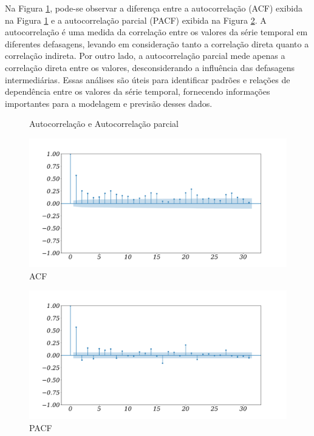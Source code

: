 Na Figura \ref{fig:acfa}, pode-se observar a diferença entre a autocorrelação (ACF) exibida na Figura \ref{fig:acfa} e a autocorrelação parcial (PACF) exibida na Figura \ref{fig:pacf}. A autocorrelação é uma medida da correlação entre os valores da série temporal em diferentes defasagens, levando em consideração tanto a correlação direta quanto a correlação indireta. Por outro lado, a autocorrelação parcial mede apenas a correlação direta entre os valores, desconsiderando a influência das defasagens intermediárias. Essas análises são úteis para identificar padrões e relações de dependência entre os valores da série temporal, fornecendo informações importantes para a modelagem e previsão desses dados.

\begin{figure}[H]
	\centering
	\caption{Autocorrelação e Autocorrelação parcial}
	\caption{ACF}\label{fig:acfa}
	\includegraphics[width=0.9\linewidth]{Resultados/Figuras/acf} 
	
\end{figure}

	
	

\begin{figure}[H]
	\centering
	\caption{PACF}\label{fig:pacf}
	\includegraphics[width=0.9\linewidth]{Resultados/Figuras/pacf}
		
		
\end{figure}

